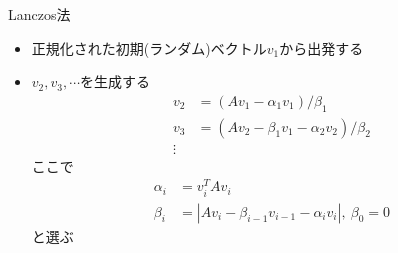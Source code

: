 \begin{frame}[t,fragile]{Lanczos法}
  \begin{itemize}
  \item 正規化された初期(ランダム)ベクトル$v_1$から出発する %
  \item $v_2,v_3,\cdots$を生成する
    \begin{align*}
      v_2 &= (Av_1 - \alpha_1 v_1)/\beta_1 \\
      v_3 &= (Av_2 - \beta_1 v_1 - \alpha_2 v_2)/\beta_2 \\
      \vdots
    \end{align*}
    ここで
    \begin{align*}
      \alpha_i &= v_i^T A v_i \\
      \beta_i &= | A v_i - \beta_{i-1} v_{i-1} - \alpha_i v_i |, \ \beta_0 = 0
    \end{align*}
    と選ぶ
  \end{itemize}
\end{frame}
